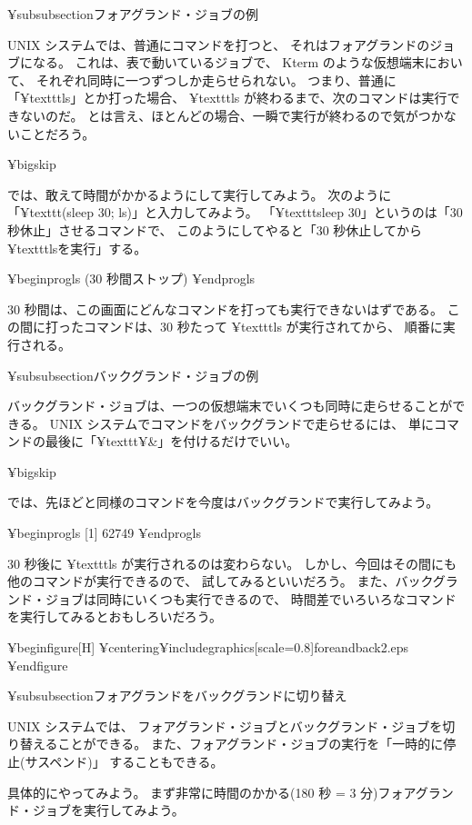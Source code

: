 ¥subsubsection{フォアグランド・ジョブの例}

UNIX システムでは、普通にコマンドを打つと、
それはフォアグランドのジョブになる。
これは、表で動いているジョブで、
 Kterm のような仮想端末において、
それぞれ同時に一つずつしか走らせられない。
つまり、普通に「¥texttt{ls}」とか打った場合、
 ¥texttt{ls} が終わるまで、次のコマンドは実行できないのだ。
とは言え、ほとんどの場合、一瞬で実行が終わるので気がつかないことだろう。

¥bigskip

では、敢えて時間がかかるようにして実行してみよう。
次のように「¥texttt{(sleep 30; ls)}」と入力してみよう。
「¥texttt{sleep 30}」というのは「30 秒休止」させるコマンドで、
このようにしてやると「30 秒休止してから ¥texttt{ls}を実行」する。

¥begin{progls}
(30 秒間ストップ)
%
¥end{progls}

30 秒間は、この画面にどんなコマンドを打っても実行できないはずである。
この間に打ったコマンドは、30 秒たって ¥texttt{ls} が実行されてから、
順番に実行される。

¥subsubsection{バックグランド・ジョブの例}

バックグランド・ジョブは、一つの仮想端末でいくつも同時に走らせることができる。
UNIX システムでコマンドをバックグランドで走らせるには、
単にコマンドの最後に「¥texttt{¥&}」を付けるだけでいい。

¥bigskip

では、先ほどと同様のコマンドを今度はバックグランドで実行してみよう。

¥begin{progls}
[1] 62749
%
¥end{progls}

30 秒後に ¥texttt{ls} が実行されるのは変わらない。
しかし、今回はその間にも他のコマンドが実行できるので、
試してみるといいだろう。
また、バックグランド・ジョブは同時にいくつも実行できるので、
時間差でいろいろなコマンドを実行してみるとおもしろいだろう。

¥begin{figure}[H]
¥centering{¥includegraphics[scale=0.8]{foreandback2.eps}}
¥end{figure}

¥subsubsection{フォアグランドをバックグランドに切り替え}

UNIX システムでは、
フォアグランド・ジョブとバックグランド・ジョブを切り替えることができる。
また、フォアグランド・ジョブの実行を「一時的に停止(サスペンド)」
することもできる。

具体的にやってみよう。
まず非常に時間のかかる(180 秒 = 3 分)フォアグランド・ジョブを実行してみよう。

